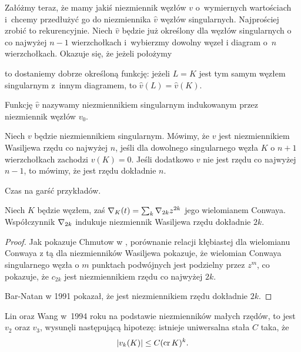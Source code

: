 Załóżmy teraz, że mamy jakiś niezmiennik węzłów $v$ o~wymiernych wartościach i~chcemy przedłużyć go do niezmiennika $\hat v$ węzłów singularnych.
Najprościej zrobić to rekurencyjnie.
Niech $\hat v$ będzie już określony dla węzłów singularnych o co najwyżej $n - 1$ wierzchołkach i~wybierzmy dowolny węzeł i diagram o~$n$ wierzchołkach.
Okazuje się, że jeżeli położymy

to dostaniemy dobrze określoną funkcję: jeżeli $L = K$ jest tym samym węzłem singularnym z~innym diagramem, to $\hat v(L) = \hat v(K)$.

Funkcję $\hat v$ nazywamy niezmiennikiem singularnym indukowanym przez niezmiennik węzłów $v_0$.

\begin{definition}
\label{def:vassiliev_order}%
%
    Niech $v$ będzie niezmiennikiem singularnym.
    Mówimy, że $v$ jest niezmiennikiem Wasiljewa rzędu co najwyżej $n$, jeśli dla dowolnego singularnego węzła $K$ o $n + 1$ wierzchołkach zachodzi $v(K) = 0$.
    Jeśli dodatkowo $v$ nie jest rzędu co najwyżej $n - 1$, to mówimy, że jest rzędu dokładnie $n$.
\end{definition}

Czas na garść przykładów.

\begin{example}
    Niech $K$ będzie węzłem, zaś $\nabla_K(t) = \sum_k \nabla_{2k} z^{2k}$ jego wielomianem Conwaya.
    Współczynnik $\nabla_{2k}$ indukuje niezmiennik Wasiljewa rzędu dokładnie $2k$.
\end{example}

\begin{proof}
    Jak pokazuje Chmutow w \cite{chmutov12}, porównanie relacji kłębiastej dla wielomianu Conwaya z tą dla niezmienników Wasiljewa pokazuje, że wielomian Conwaya singularnego węzła o $m$ punktach podwójnych jest podzielny przez $z^m$, co pokazuje, że $c_{2k}$ jest niezmiennikiem rzędu co najwyżej $2k$.

    Bar-Natan w 1991 pokazał, że jest niezmiennikiem rzędu dokładnie $2k$.
\end{proof}

%
Lin oraz Wang \cite{wang96} w~1994 roku na podstawie niezmienników małych rzędów, to jest $v_2$ oraz $v_3$, wysunęli następującą hipotezę: istnieje uniwersalna stała $C$ taka, że
\begin{equation}
    |v_k(K)| \le C (\operatorname{cr} K)^k.
\end{equation}

